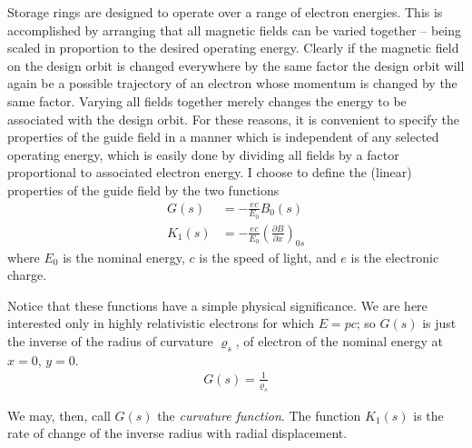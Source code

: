 Storage rings are designed to operate over a range of electron energies. This is accomplished  by arranging that all magnetic fields can be varied together -- being scaled in proportion to the desired operating energy. Clearly if the magnetic field on the design orbit is changed everywhere by the same factor the design orbit will again be a possible trajectory of an electron whose momentum is changed by the same factor. Varying all fields together merely changes the energy to be associated with the design orbit. For these reasons, it is convenient to specify the properties of the guide field in a manner which is independent of any selected operating energy, which is easily done by dividing all fields by a factor proportional to associated electron energy. I choose to define the (linear) properties of the guide field by the two functions
\begin{align}\label{eq:2.3}
	G(s)   &= - \frac{ec}{E_0}B_0(s)\\
	K_1(s) &= - \frac{ec}{E_0} \left(\frac{\partial B}{\partial x}\right)_{0s} \label{eq:2.4}
\end{align}
where $E_0$ is the nominal energy, $c$ is the speed of light, and $e$ is the electronic charge.

Notice that these functions have a simple physical significance. We are here interested only in highly relativistic electrons for which $E = pc$; so $G(s)$ is just the inverse of the radius of curvature $\varrho_s$, of electron of the nominal energy at $x = 0$, $y = 0$.
\begin{align}
	G(s) = \frac{1}{\varrho_s}
\end{align}

We may, then, call $G(s)$ the \textit{curvature function}. The function $K_1(s)$ is the rate of change of the inverse radius with radial displacement.

